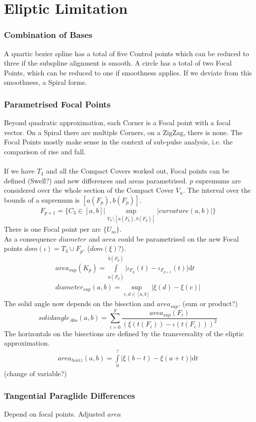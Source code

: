 \documentclass[a4paper,landscape]{report}
\begin{document}
\chapter{Eliptic Limitation}
\subsection{Combination of Bases}
A quartic bezier spline has a total of five Control points which can be reduced to three if the subspline alignment is smooth. A circle has a total of two Focal Points, which can be reduced to one if smoothness applies. If we deviate from this smoothness, a Spiral forms.
\subsection{Parametrised Focal Points}
Beyond quadratic approximation, each Corner is a Focal point with a focal vector. On a Spiral there are multiple Corners, on a ZigZag, there is none. The Focal Points mostly make sense in the context of sub-pulse analysis, i.e. the comparison of rise and fall.\\\\
If we have $T_{3}$ and all the Compact Covers worked out, Focal points can be defined (Swell?) and new differences and areas parametrised. $p$ supremums are considered over the whole section of the Compact Cover $V_{n}$. The interval over the bounds of a supremum is $[a(F_{p}),b(F_{p})]$.
\begin{align}
F_{p+1} = \{ C_{3} \in  [a,b]\vert \sup \limits _{V_{n} \setminus [a(F_{p}),b(F_{p})]} \lvert curvature(a,b) \rvert \}
\end{align}
There is one Focal point per arc $\{U_{m}\}$.\\
As a consequence $diameter$ and $area$ could be parametrised on the new Focal points $dom(\iota)=T_{3}\cup F_{p}$. ($dom(\xi)$?).\\
\begin{align}
area_{sup}(K_{p})=\int \limits _{a(F_{p})}^{b(F_{p})} \lvert \iota_{F_{p}}(t)-\iota_{F_{p+1}}(t) \rvert \mathrm{d}t\\
diameter_{sup}(a,b)=\sup \limits _{c,d \in [a,b]} \lvert \xi(d) - \xi(c) \rvert
\end{align}
The solid angle now depends on the bisection and $area_{sup}$. (sum or product?)
\begin{equation}
solidangle_{Abs}(a,b)=\sum \limits _{i=0}^{p} \frac{area_{sup}(F_{i})}{(\xi(t(F_{i}))-\iota(t(F_{i})))^2}
\end{equation}
The horizontals on the bisections are defined by the transversality of the eliptic approximation.
\begin{align}
area_{horiz}(a,b)=\int \limits _{0}^{?} \lvert \xi(b-t)-\xi(a+t) \rvert \mathrm{d}t
\end{align}
(change of variable?)
\subsection{Tangential Paraglide Differences}
Depend on focal points. Adjusted $area$

\iffalse
\printbibliography
\fi
{}

\end{document}
